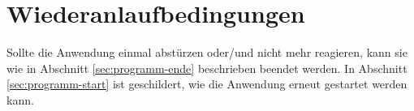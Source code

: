 
\section{Wiederanlaufbedingungen}
\label{sec:wiederanlaufbedingungen}

Sollte die Anwendung einmal abstürzen oder/und nicht mehr reagieren, kann sie wie in Abschnitt \ref{sec:programm-ende} beschrieben beendet werden.
In Abschnitt \ref{sec:programm-start} ist geschildert, wie die Anwendung erneut gestartet werden kann.
